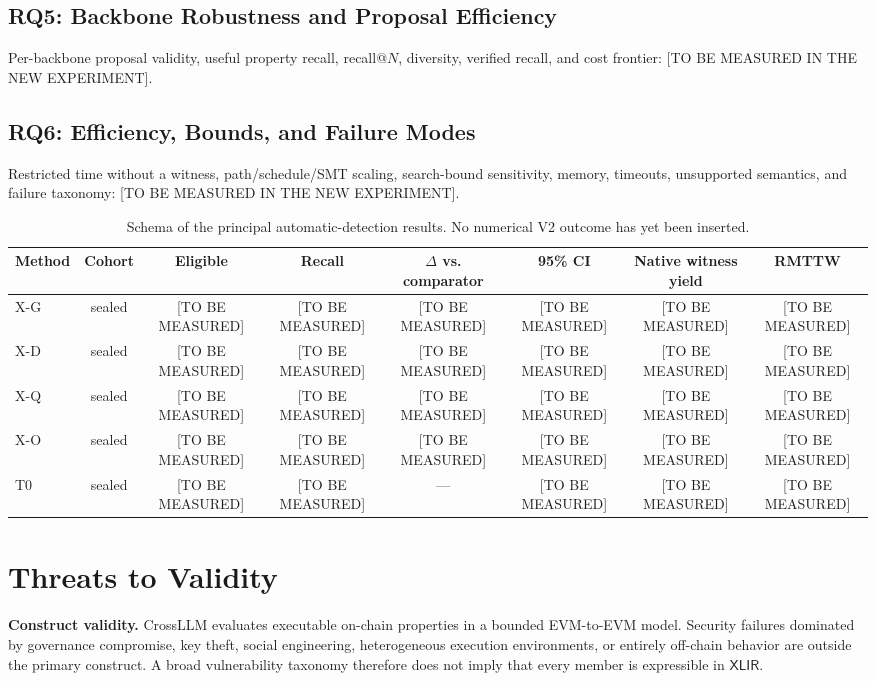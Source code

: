 \documentclass[journal]{IEEEtran}
\theoremstyle{definition}
\newcommand{\xlir}{\ensuremath{\mathsf{XLIR}}}
\newcommand{\CrossTBD}{\textnormal{[TO BE MEASURED IN THE NEW EXPERIMENT]}}
\newcommand{\ResultTBD}{\textnormal{[TO BE MEASURED]}}
\begin{document}
\subsection{RQ5: Backbone Robustness and Proposal Efficiency}
Per-backbone proposal validity, useful property recall, recall@$N$, diversity, verified recall, and cost frontier: \CrossTBD.

\subsection{RQ6: Efficiency, Bounds, and Failure Modes}
Restricted time without a witness, path/schedule/SMT scaling, search-bound sensitivity, memory, timeouts, unsupported semantics, and failure taxonomy: \CrossTBD.

\begin{table}[t]
\centering
\caption{Schema of the principal automatic-detection results. No numerical V2 outcome has yet been inserted.}
\label{tab:main-v2}
\small
\begin{tabular}{@{}lccccccc@{}}
\toprule
Method & Cohort & Eligible & Recall & $\Delta$ vs. comparator & 95\% CI & Native witness yield & RMTTW \\ \midrule
X-G & sealed & \ResultTBD & \ResultTBD & \ResultTBD & \ResultTBD & \ResultTBD & \ResultTBD \\
X-D & sealed & \ResultTBD & \ResultTBD & \ResultTBD & \ResultTBD & \ResultTBD & \ResultTBD \\
X-Q & sealed & \ResultTBD & \ResultTBD & \ResultTBD & \ResultTBD & \ResultTBD & \ResultTBD \\
X-O & sealed & \ResultTBD & \ResultTBD & \ResultTBD & \ResultTBD & \ResultTBD & \ResultTBD \\
T0 & sealed & \ResultTBD & \ResultTBD & --- & \ResultTBD & \ResultTBD & \ResultTBD \\
\bottomrule
\end{tabular}
\end{table}

\section{Threats to Validity}
\label{sec:validity}

\noindent\textbf{Construct validity.} CrossLLM evaluates executable on-chain properties in a bounded EVM-to-EVM model. Security failures dominated by governance compromise, key theft, social engineering, heterogeneous execution environments, or entirely off-chain behavior are outside the primary construct. A broad vulnerability taxonomy therefore does not imply that every member is expressible in \xlir.
\end{document}
